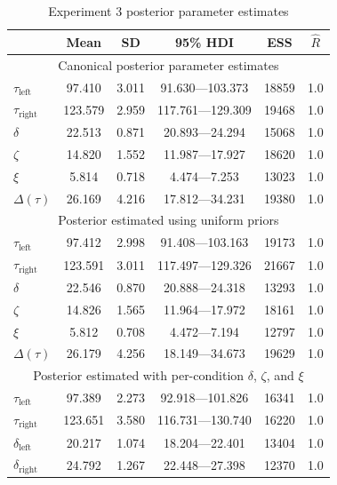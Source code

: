 \documentclass[doc,biblatex,floatsintext]{apa7}
\begin{document}
\begin{table}
\begin{center}
\begin{threeparttable}
\caption{Experiment 3 posterior parameter estimates}
\footnotesize
\begin{tabular}{lccccc}
\toprule
{} &   Mean &     SD &  95\% HDI &  ESS &  $\hat{R}$ \\
\midrule
\multicolumn{6}{c}{Canonical posterior parameter estimates} \\
\midrule
$\tau_\mathrm{left}$  &  97.410 & 3.011 &  91.630---103.373 & 18859 & 1.0 \\
$\tau_\mathrm{right}$ & 123.579 & 2.959 & 117.761---129.309 & 19468 & 1.0 \\
$\delta$              &  22.513 & 0.871 &  20.893---24.294  & 15068 & 1.0 \\
$\zeta$               &  14.820 & 1.552 &  11.987---17.927  & 18620 & 1.0 \\
$\xi$                 &   5.814 & 0.718 &   4.474---7.253   & 13023 & 1.0 \\
$\Delta(\tau)$        &  26.169 & 4.216 &  17.812---34.231  & 19380 & 1.0 \\
\midrule
\multicolumn{6}{c}{Posterior estimated using uniform priors} \\
\midrule
$\tau_\mathrm{left}$  &  97.412 & 2.998 &  91.408---103.163 & 19173 & 1.0 \\
$\tau_\mathrm{right}$ & 123.591 & 3.011 & 117.497---129.326 & 21667 & 1.0 \\
$\delta$              &  22.546 & 0.870 &  20.888---24.318  & 13293 & 1.0 \\
$\zeta$               &  14.826 & 1.565 &  11.964---17.972  & 18161 & 1.0 \\
$\xi$                 &   5.812 & 0.708 &   4.472---7.194   & 12797 & 1.0 \\
$\Delta(\tau)$        &  26.179 & 4.256 &  18.149---34.673  & 19629 & 1.0 \\
\midrule
\multicolumn{6}{c}{Posterior estimated with per-condition $\delta$, $\zeta$, and $\xi$} \\
\midrule
$\tau_\mathrm{left}$    &  97.389 & 2.273 &  92.918---101.826 & 16341 & 1.0 \\
$\tau_\mathrm{right}$   & 123.651 & 3.580 & 116.731---130.740 & 16220 & 1.0 \\
$\delta_\mathrm{left}$  &  20.217 & 1.074 &  18.204---22.401  & 13404 & 1.0 \\
$\delta_\mathrm{right}$ &  24.792 & 1.267 &  22.448---27.398  & 12370 & 1.0 \\

\end{tabular}
\end{threeparttable}
\end{center}
\end{table}
\end{document}

